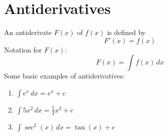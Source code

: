 \documentclass{article}
\begin{document}
\section*{Antiderivatives}

An antiderivate $F(x)$ of $f(x)$ is defined by
\[F'(x) = f(x)\]
Notation for $F(x)$:
\[F(x) = \int f(x) \,dx\]
Some basic examples of antiderivatives:

\begin{multicols}{2}
    \begin{enumerate}
        \item $\int e^x \,dx = e^x+c$
        \item $\int 5x^2 \,dx = \frac{5}{3}x^3+c$
        \item $\int \sec^2(x) \,dx = \tan(x)+c$
    \end{enumerate}
\end{multicols}
\end{document}
